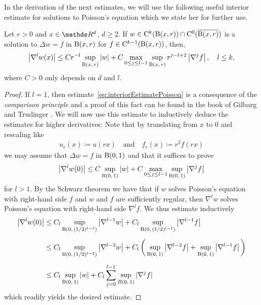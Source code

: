 In the derivation of the next estimates, we will use the following useful interior estimate for solutions to Poisson's equation which we state her for further use.
\begin{lem}
  \label{lem:interiorEstimatePoisson}
  Let $r > 0$ and $x \in \R^d$, $d \geq 2$. 
  If $w \in \mathrm{C}^{k}(\mathrm{B}(x,r)) \cap \mathrm{C}^0(\overline{\mathrm{B}(x,r)})$ is a solution to $\Delta w = f$ in $\mathrm{B}(x,r)$ for $f \in \mathrm{C}^{k - 1}(\mathrm{B}(x,r))$, then,
  \begin{align}
    \label{eq:interiorEstimatePoisson}
    \big|\nabla^l w(x)\big| \leq C r^{-l} \sup_{\mathrm{B}(x,\,r)} |w| + C \max_{0 \leq j \leq l - 1} \sup_{\mathrm{B}(x,\,r)} r^{j - l + 2} \, \big|\nabla^j f\big|\,, 
    \quad l \leq k,
  \end{align}
  where $C > 0$ only depends on $d$ and $l$.
\end{lem}

\begin{proof}
  If $l = 1$, then estimate~\eqref{eq:interiorEstimatePoisson} is a consequence of the \emph{comparison principle} and a proof of this fact can be found in the book of Gilbarg and Trudinger \cite[Sec.\@~3.4,~~ Eq.\@~(3.16)]{gilbarg}.
  We will now use this estimate to inductively deduce the estimates for higher derivatives:
  Note that by translating from $x$ to $0$ and rescaling like
  \begin{align*}
    u_r(x) \coloneqq u(rx) \quad\text{and}\quad f_r(x) \coloneqq r^2 f(rx)
  \end{align*}
  we may assume that $\Delta w = f$ in $\mathrm{B}(0,1)$ and that it suffices to prove
  \begin{align}
    \label{eq:interiorEstimatePoissonSimple}
    \big|\nabla^l w(0) \big| \leq C \sup_{\mathrm{B}(0,\,1)} |w| + C \max_{0 \leq j \leq l - 1} \sup_{\mathrm{B}(0,\,1)} \big|\nabla^j f\big|
  \end{align}
  for $l > 1$.
  By the Schwarz theorem we have that if $w$ solves Poisson's equation with right-hand side $f$ and $w$ and $f$ are sufficiently regular, then $\nabla^l w$ solves Poisson's equation with right-hand side $\nabla^l f$.
  We thus estimate inductively
  \begin{align*}
    \big|\nabla^l w(0)\big|
    &\leq C_l \sup_{\mathrm{B}(0,\, (1/2)^{l - 1})} \big|\nabla^{l - 1} w\big| + C_l \sup_{\mathrm{B}(0,\, (1/2)^{l-1})} \big|\nabla^{l - 1} f\big| \\[0.5em]
    &\leq C_l \sup_{\mathrm{B}(0,\, (1/2)^{l-2})} \big|\nabla^{l - 2} w\big| + C_l\, \bigg(\sup_{\mathrm{B}(0,\,1)} \big|\nabla^{l - 2} f\big| + \sup_{\mathrm{B}(0,\,1)} \big|\nabla^{l - 1} f\big| \,\bigg) \\[0.5em]
    &\leq C_l  \sup_{\mathrm{B}(0,\,1)} |w| + C_l \sum_{j = 0}^{l - 1} \sup_{B(0,\,1)} |\nabla^j f|
  \end{align*}
  which readily yields the desired estimate.
\end{proof}

